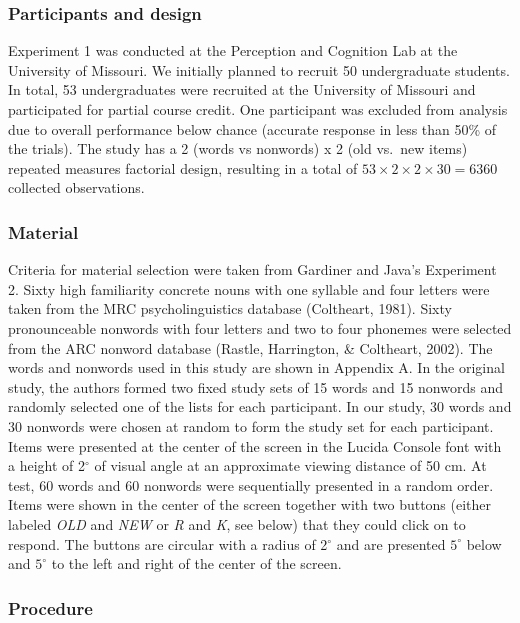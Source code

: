 \documentclass[english,,man,floatsintext]{apa6}
\begin{document}
\hypertarget{participants-and-design}{%
\subsubsection{Participants and design}\label{participants-and-design}}

Experiment 1 was conducted at the Perception and Cognition Lab at the University of Missouri. We initially planned to recruit 50 undergraduate students. In total, 53 undergraduates were recruited at the University of Missouri and participated for partial course credit. One participant was excluded from analysis due to overall performance below chance (accurate response in less than 50\% of the trials). The study has a 2 (words vs nonwords) x 2 (old vs.~new items) repeated measures factorial design, resulting in a total of \(53 \times 2 \times 2 \times 30 = 6360\) collected observations.

\hypertarget{material}{%
\subsubsection{Material}\label{material}}

Criteria for material selection were taken from Gardiner and Java's Experiment 2. Sixty high familiarity concrete nouns with one syllable and four letters were taken from the MRC psycholinguistics database (Coltheart, 1981). Sixty pronounceable nonwords with four letters and two to four phonemes were selected from the ARC nonword database (Rastle, Harrington, \& Coltheart, 2002). The words and nonwords used in this study are shown in Appendix A. In the original study, the authors formed two fixed study sets of 15 words and 15 nonwords and randomly selected one of the lists for each participant. In our study, 30 words and 30 nonwords were chosen at random to form the study set for each participant. Items were presented at the center of the screen in the Lucida Console font with a height of 2\(^{\circ}\) of visual angle at an approximate viewing distance of 50 cm. At test, 60 words and 60 nonwords were sequentially presented in a random order. Items were shown in the center of the screen together with two buttons (either labeled \emph{OLD} and \emph{NEW} or \emph{R} and \emph{K}, see below) that they could click on to respond. The buttons are circular with a radius of 2\(^{\circ}\) and are presented \(5^{\circ}\) below and \(5^{\circ}\) to the left and right of the center of the screen.

\hypertarget{procedure}{%
\subsubsection{Procedure}\label{procedure}}
\end{document}
